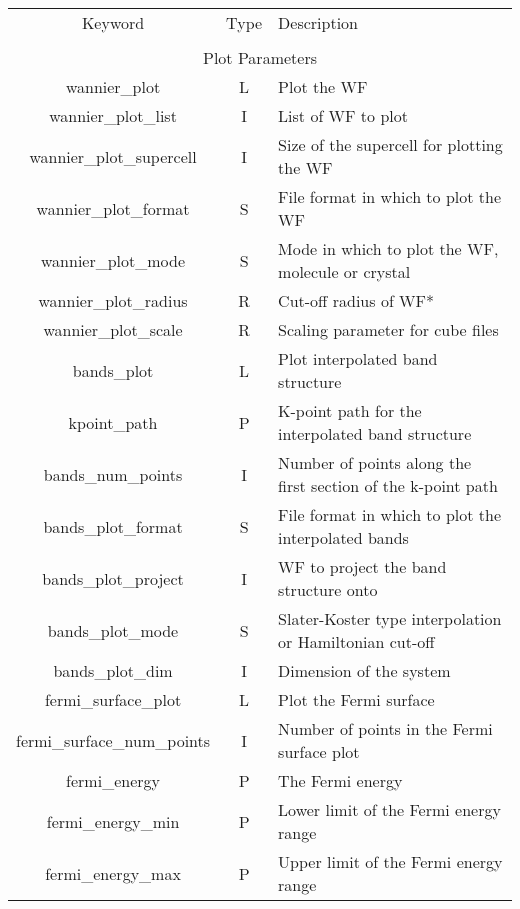 \begin{table}
\begin{center}
\begin{tabular}{|c|c|p{6cm}|}
  \hline
  Keyword & Type & Description \\
  &      &             \\
  \hline\hline
  \multicolumn{3}{|c|}{Plot Parameters} \\
  \hline
  {\sc wannier\_plot }   & L & Plot the WF \\
  {\sc wannier\_plot\_list } & I & List of WF to plot \\
  {\sc wannier\_plot\_supercell }   & I & Size of the supercell for
  plotting the WF \\
  {\sc wannier\_plot\_format }   & S & File format in which to plot the
  WF \\
  {\sc wannier\_plot\_mode }   & S & Mode in which to plot the
  WF, molecule or crystal \\ 
  {\sc wannier\_plot\_radius } & R & Cut-off radius of WF* \\ 
  {\sc wannier\_plot\_scale } & R & Scaling parameter for cube files \\ 
  {\sc bands\_plot }   & L & Plot interpolated band structure \\
  {\sc kpoint\_path }   & P & K-point path for the interpolated band structure  \\
  {\sc bands\_num\_points }   & I & Number of points along the first
  section of the k-point path \\
  {\sc bands\_plot\_format }   & S & File format in which to plot the
  interpolated bands \\
  {\sc bands\_plot\_project } & I & WF to project the band structure onto \\
  {\sc bands\_plot\_mode }   & S & Slater-Koster type interpolation or
  Hamiltonian cut-off \\
  {\sc bands\_plot\_dim } & I & Dimension of the system \\
  {\sc fermi\_surface\_plot }   & L & Plot the Fermi surface \\
  {\sc fermi\_surface\_num\_points }   & I & Number of points in the Fermi
  surface plot\\
  {\sc fermi\_energy }   & P & The Fermi energy \\
  {\sc fermi\_energy\_min }   & P & Lower limit of
  the Fermi energy range\\
  {\sc fermi\_energy\_max }   & P & Upper limit of
  the Fermi energy range\\

\end{tabular}
\end{center}
\end{table}
